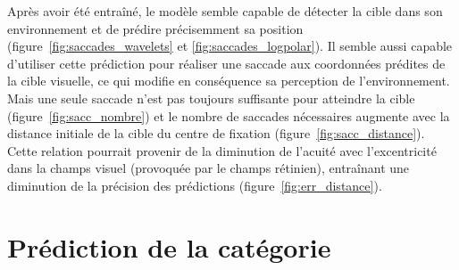 Après avoir été entraîné, le modèle semble capable de détecter la cible dans son environnement et de prédire précisemment sa position (figure~\ref{fig:saccades_wavelets} et \ref{fig:saccades_logpolar}). Il semble aussi capable d'utiliser cette prédiction pour réaliser une saccade aux coordonnées prédites de la cible visuelle, ce qui modifie en conséquence sa perception de l'environnement.\\
Mais une seule saccade n'est pas toujours suffisante pour atteindre la cible (figure~\ref{fig:sacc_nombre}) et le nombre de saccades nécessaires augmente avec la distance initiale de la cible du centre de fixation (figure~\ref{fig:sacc_distance}). Cette relation pourrait provenir de la diminution de l'acuité avec l'excentricité dans la champs visuel (provoquée par le champs rétinien), entraînant une diminution de la précision des prédictions (figure~\ref{fig:err_distance}).\\


\section{Prédiction de la catégorie}

